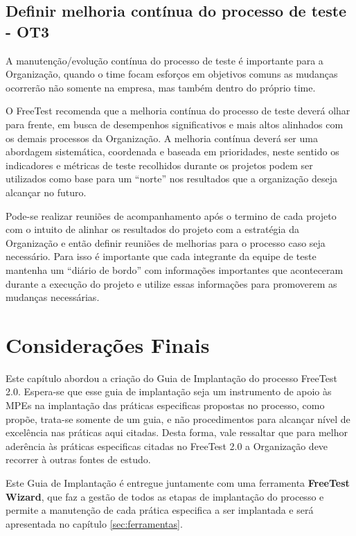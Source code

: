 \subsection{Definir melhoria contínua do processo de teste - OT3}
\label{sec:guiaot3}

A manutenção/evolução contínua do processo de teste é importante para a Organização, quando o time focam esforços em objetivos comuns as mudanças ocorrerão não somente na empresa, mas também dentro do próprio time.

O FreeTest recomenda que a melhoria contínua do processo de teste deverá olhar para frente, em busca de desempenhos significativos e mais altos alinhados com os demais processos da Organização. A melhoria contínua deverá ser uma abordagem sistemática, coordenada e baseada em prioridades, neste sentido os indicadores e métricas de teste recolhidos durante os projetos podem ser utilizados como base para um “norte” nos resultados que a organização deseja alcançar no futuro.

Pode-se realizar reuniões de acompanhamento após o termino de cada projeto com o intuito de alinhar os resultados do projeto com a estratégia da Organização e então definir reuniões de melhorias para o processo caso seja necessário. Para isso é importante que cada integrante da equipe de teste mantenha um “diário de bordo” com informações importantes que aconteceram durante a execução do projeto e utilize essas informações para promoverem as mudanças necessárias.

\section{Considerações Finais}
\label{sec:consideracoesfinaisguiaimplantacao}

Este capítulo abordou a criação do Guia de Implantação do processo FreeTest 2.0. Espera-se que esse guia de implantação seja um instrumento de apoio às MPEs na implantação das práticas especificas propostas no processo, como propõe, trata-se somente de um guia, e não procedimentos para alcançar nível de excelência nas práticas aqui citadas. Desta forma, vale ressaltar que para melhor aderência às práticas especificas citadas no FreeTest 2.0 a Organização deve recorrer à outras fontes de estudo.

Este Guia de Implantação é entregue juntamente com uma ferramenta \textbf{FreeTest Wizard}, que faz a gestão de todos as etapas de implantação do processo e permite a manutenção de cada prática especifica a ser implantada e será apresentada no capítulo \ref{sec:ferramentas}.